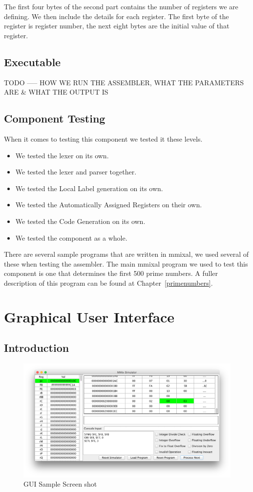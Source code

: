 \documentclass[a4paper,11pt]{report}
\begin{document}
The first four bytes of the second part contains the number of registers we are defining. We then include the details for each register. The first byte of the register is register number, the next eight bytes are the initial value of that register.

\section{Executable}
TODO ----- HOW WE RUN THE ASSEMBLER, WHAT THE PARAMETERS ARE \& WHAT THE OUTPUT IS
\section{Component Testing}
When it comes to testing this component we tested it these levels.
\begin{itemize}
\item We tested the lexer on its own.
\item We tested the lexer and parser together.
\item We tested the Local Label generation on its own.
\item We tested the Automatically Assigned Registers on their own.
\item We tested the Code Generation on its own.
\item We tested the component as a whole.
\end{itemize}

There are several sample programs that are written in mmixal, we used several of these when testing the assembler. The main mmixal program we used to test this component is one that determines the first 500 prime numbers. A fuller description of this program can be found at Chapter~\ref{primenumbers}.
\chapter{Graphical User Interface}
\section{Introduction}
\begin{figure}[h!]
\centering
\includegraphics[width=\textwidth]{GUISample}
\caption{GUI Sample Screen shot}
\end{figure}
\end{document}
